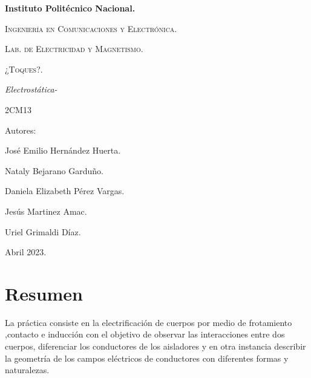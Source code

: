 \documentclass[spanish,10pt,a4paper,onecolumn]{article}
\begin{document}
	\lhead{}
	\begin{titlepage}
	
		\begin{figure}[t]
			\hspace{0.6\textwidth}
		\end{figure}
	
		\centering
		{\bfseries\Huge Instituto Politécnico Nacional. \par}
		\vspace{1cm}
		{\scshape\Large Ingeniería en Comunicaciones y Electrónica. \par}
		\vspace{0.3cm}
		{\scshape\Large Lab. de Electricidad y Magnetismo.  \par}
		\vspace{1cm}
		{\scshape\Huge ¿Toques?. \par}
		\vspace{1cm}
		{\itshape\Large Electrostática-\par}
		{\Large 2CM13\par}
		\vfill
		{\Large Autores: \par}
		{\Large José Emilio Hernández Huerta. \par}
		{\Large Nataly Bejarano Garduño. \par}
		{\Large Daniela Elizabeth Pérez Vargas. \par}
		{\Large Jesús Martinez Amac.\par}
		{\Large Uriel Grimaldi Díaz.  \par}
		\vfill
		{\Large Abril 2023. \par}
	\end{titlepage}

\tableofcontents

\newpage

\section{Resumen}
La práctica consiste en la electrificación de cuerpos por medio de frotamiento ,contacto e inducción con el objetivo de observar las interacciones entre dos cuerpos, diferenciar los conductores de los aisladores y en otra instancia describir la geometría de los campos eléctricos de conductores con diferentes formas y naturalezas.
\end{document}
